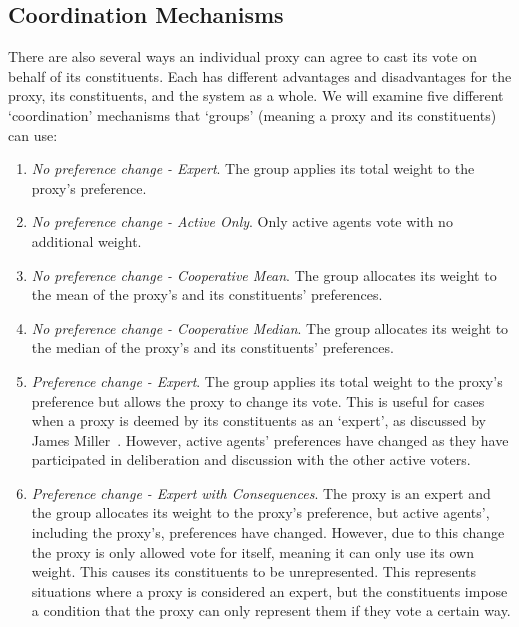 \subsection{Coordination Mechanisms}
\label{subsec:coordination-mechanisms}
There are also several ways an individual proxy can agree to cast its vote on behalf
of its constituents.
Each has different advantages and disadvantages for the proxy, its constituents, and
the system as a whole.
We will examine five different `coordination' mechanisms that `groups' (meaning a
proxy and its constituents) can use:
\begin{enumerate}
    \item {
        \textit{No preference change - Expert}.
        The group applies its total weight to the proxy's preference.
    }
    \item {
        \textit{No preference change - Active Only}.  
        Only active agents vote with no additional weight.
    }
    \item {
        \textit{No preference change - Cooperative Mean}.
        The group allocates its weight to the mean of the proxy's and its
        constituents' preferences.
    }
    \item {
        \textit{No preference change - Cooperative Median}.
        The group allocates its weight to the median of the proxy's and its
        constituents' preferences.
    }
    \item {
        \textit{Preference change - Expert}.
        The group applies its total weight to the proxy's preference but allows the proxy to change its vote.
        This is useful for cases when a proxy is deemed by its constituents as an
        `expert', as discussed by James Miller~\cite{Miller1969}.
        However, active agents' preferences have changed as they have participated in
        deliberation and discussion with the other active voters.
    }
    \item {
        \textit{Preference change - Expert with Consequences}.
        The proxy is an expert and the group allocates its weight to the proxy's
        preference, but active agents', including the proxy's, preferences have changed.
        However, due to this change the proxy is only allowed vote for itself,
        meaning it can only use its own weight.
        This causes its constituents to be unrepresented.
        This represents situations where a proxy is considered an expert, but the
        constituents impose a condition that the proxy can only represent them if
        they vote a certain way.

}
\end{enumerate}
